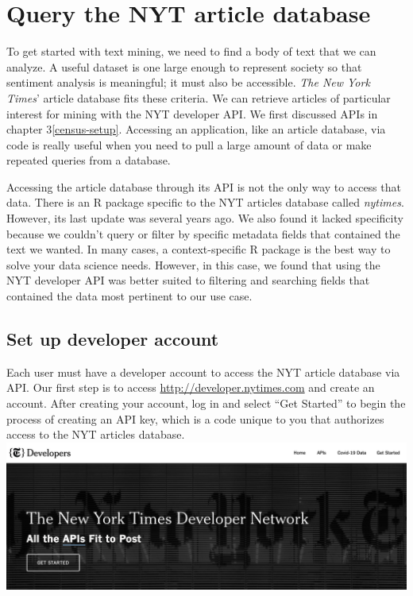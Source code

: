 \documentclass[
  krantz2]{krantz}
\begin{document}
\hypertarget{text-api}{%
\section{Query the NYT article database}\label{text-api}}

To get started with text mining, we need to find a body of text that we can analyze. A useful dataset is one large enough to represent society so that sentiment analysis is meaningful; it must also be accessible. \emph{The New York Times}' article database fits these criteria. We can retrieve articles of particular interest for mining with the NYT developer API. We first discussed APIs in chapter 3\ref{census-setup}. Accessing an application, like an article database, via code is really useful when you need to pull a large amount of data or make repeated queries from a database.

Accessing the article database through its API is not the only way to access that data. There is an R package specific to the NYT articles database called \emph{nytimes}. However, its last update was several years ago. We also found it lacked specificity because we couldn't query or filter by specific metadata fields that contained the text we wanted. In many cases, a context-specific R package is the best way to solve your data science needs. However, in this case, we found that using the NYT developer API was better suited to filtering and searching fields that contained the data most pertinent to our use case.

\hypertarget{dev-account}{%
\subsection{Set up developer account}\label{dev-account}}

Each user must have a developer account to access the NYT article database via API. Our first step is to access \url{http://developer.nytimes.com} and create an account. After creating your account, log in and select ``Get Started'' to begin the process of creating an API key, which is a code unique to you that authorizes access to the NYT articles database.
\includegraphics{images/nyt-api-get-started.png}
\end{document}
